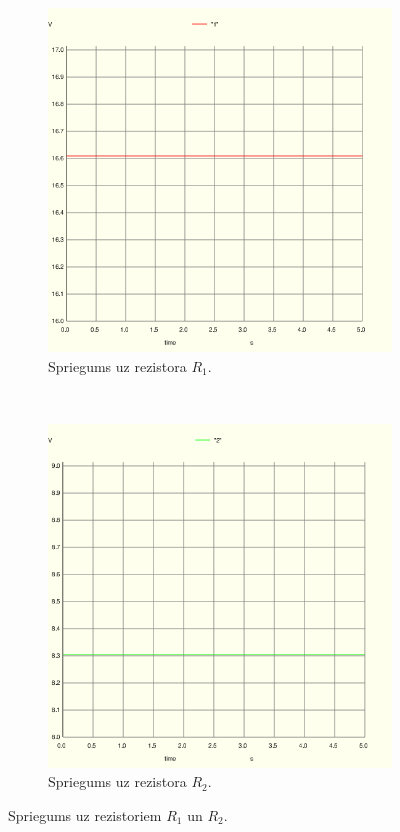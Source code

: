 \documentclass[12pt,table]{report}
\begin{document}
\begin{figure}[H]
    \centering
    \begin{subfigure}[b]{0.45\textwidth}
        \centering
				\includegraphics[scale=0.38]{img/plot1.png}
				\caption{Spriegums uz rezistora $R_1$.}
				\label{fig:r1_spriegums}
    \end{subfigure}%
    ~ 
    \begin{subfigure}[b]{0.45\textwidth}
        \centering
				\includegraphics[scale=0.38]{img/plot2.png}
				\caption{Spriegums uz rezistora $R_2$.}
				\label{fig:r2_spriegums}
    \end{subfigure}
    \caption{Spriegums uz rezistoriem $R_1$ un $R_2$.}
\end{figure}
\end{document}
